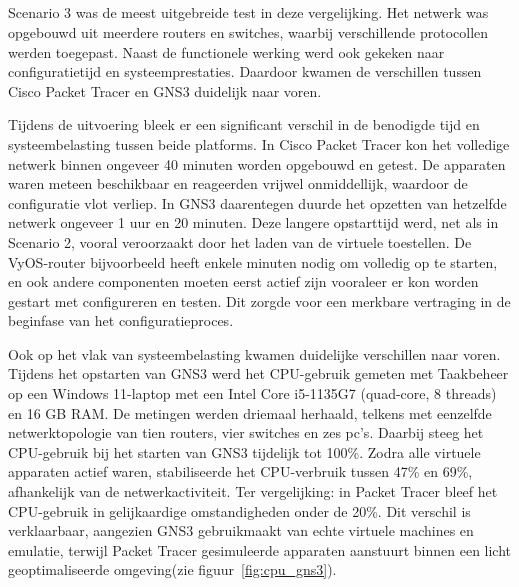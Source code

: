 \subsection{}

Scenario 3 was de meest uitgebreide test in deze vergelijking. Het netwerk was opgebouwd uit meerdere routers en switches, waarbij verschillende protocollen werden toegepast. Naast de functionele werking werd ook gekeken naar configuratietijd en systeemprestaties. Daardoor kwamen de verschillen tussen Cisco Packet Tracer en GNS3 duidelijk naar voren.

\vspace{0.3cm}

Tijdens de uitvoering bleek er een significant verschil in de benodigde tijd en systeembelasting tussen beide platforms. In Cisco Packet Tracer kon het volledige netwerk binnen ongeveer 40 minuten worden opgebouwd en getest. De apparaten waren meteen beschikbaar en reageerden vrijwel onmiddellijk, waardoor de configuratie vlot verliep. In GNS3 daarentegen duurde het opzetten van hetzelfde netwerk ongeveer 1 uur en 20 minuten. Deze langere opstarttijd werd, net als in Scenario 2, vooral veroorzaakt door het laden van de virtuele toestellen. De VyOS-router bijvoorbeeld heeft enkele minuten nodig om volledig op te starten, en ook andere componenten moeten eerst actief zijn vooraleer er kon worden gestart met configureren en testen. Dit zorgde voor een merkbare vertraging in de beginfase van het configuratieproces.

\vspace{0.3cm}



Ook op het vlak van systeembelasting kwamen duidelijke verschillen naar voren. Tijdens het opstarten van GNS3 werd het CPU-gebruik gemeten met Taakbeheer op een Windows 11-laptop met een Intel Core i5-1135G7 (quad-core, 8 threads) en 16 GB RAM. De metingen werden driemaal herhaald, telkens met eenzelfde netwerktopologie van tien routers, vier switches en zes pc’s. Daarbij steeg het CPU-gebruik bij het starten van GNS3 tijdelijk tot 100\%. Zodra alle virtuele apparaten actief waren, stabiliseerde het CPU-verbruik tussen 47\% en 69\%, afhankelijk van de netwerkactiviteit. Ter vergelijking: in Packet Tracer bleef het CPU-gebruik in gelijkaardige omstandigheden onder de 20\%. Dit verschil is verklaarbaar, aangezien GNS3 gebruikmaakt van echte virtuele machines en emulatie, terwijl Packet Tracer gesimuleerde apparaten aanstuurt binnen een licht geoptimaliseerde omgeving(zie figuur~\ref{fig:cpu_gns3}).

